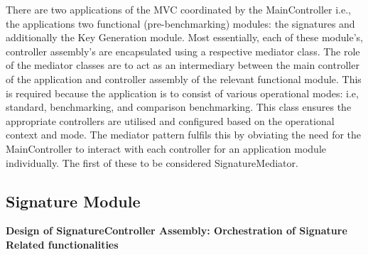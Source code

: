 \documentclass[]{final_report}
\theoremstyle{definition}
\begin{document}
There are two applications of the MVC coordinated by the MainController i.e., the applications two functional (pre-benchmarking) modules: the signatures and additionally the Key Generation module. Most essentially, each of these module's, controller assembly's are encapsulated using a respective mediator class. The role of the mediator classes are to act as an intermediary between the main controller of the application and controller assembly of the relevant functional module. This is required because the application is to consist of various operational modes: i.e, standard, benchmarking, and comparison benchmarking. This class ensures the appropriate controllers are utilised and configured based on the operational context and mode. The mediator pattern fulfils this by obviating the need for the MainController to interact with each controller for an application module individually. The first of these to be considered SignatureMediator.



\subsection{Signature Module}

\textbf{Design of SignatureController Assembly: Orchestration of Signature Related functionalities}
\end{document}

